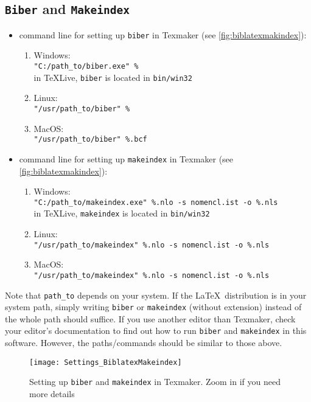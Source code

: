 \subsection{\texttt{Biber} and \texttt{Makeindex}}\label{subsec:biblatexmakeindex}
\begin{itemize}
	\item command line for setting up \verb+biber+ in Texmaker (see \autoref{fig:biblatexmakindex}):
	      \begin{enumerate}
		      \item Windows:\\ \verb+"C:/path_to/biber.exe" %+ \\
		            in \TeX Live, \verb+biber+ is located in \verb+bin/win32+
		      \item Linux:\\ \verb+"/usr/path_to/biber" %+
		      \item MacOS:\\ \verb+"/usr/path_to/biber" %.bcf+
	      \end{enumerate}
	\item command line for setting up \verb+makeindex+ in Texmaker (see \autoref{fig:biblatexmakindex}):
	      \begin{enumerate}
		      \item Windows:\\
		            {\footnotesize \verb+"C:/path_to/makeindex.exe" %.nlo -s nomencl.ist -o %.nls+}\\
		            in \TeX Live, \verb+makeindex+ is located in \verb+bin/win32+
		      \item Linux:\\
		            {\footnotesize \verb+"/usr/path_to/makeindex" %.nlo -s nomencl.ist -o %.nls+}
		      \item MacOS:\\
		            {\footnotesize \verb+"/usr/path_to/makeindex" %.nlo -s nomencl.ist -o %.nls+}
	      \end{enumerate}
\end{itemize}	      
Note that \verb+path_to+ depends on your system. If the \LaTeX\ distribution is in your system path, simply writing \verb+biber+ or \verb+makeindex+ (without extension) instead of the whole path should suffice. If you use another editor than Texmaker,  check your editor's documentation to find out how to run \verb+biber+ and \verb+makeindex+ in this software. However, the paths/commands should be similar to those above.
\begin{figure}[tbh]
	\centering
	\texttt{[image: Settings\_BiblatexMakeindex]}
	\caption[Setting up \texttt{biber} and \texttt{makeindex} in Texmaker]{Setting up \texttt{biber} and \texttt{makeindex} in Texmaker. Zoom in if you need more details}\label{fig:biblatexmakindex}
\end{figure}
